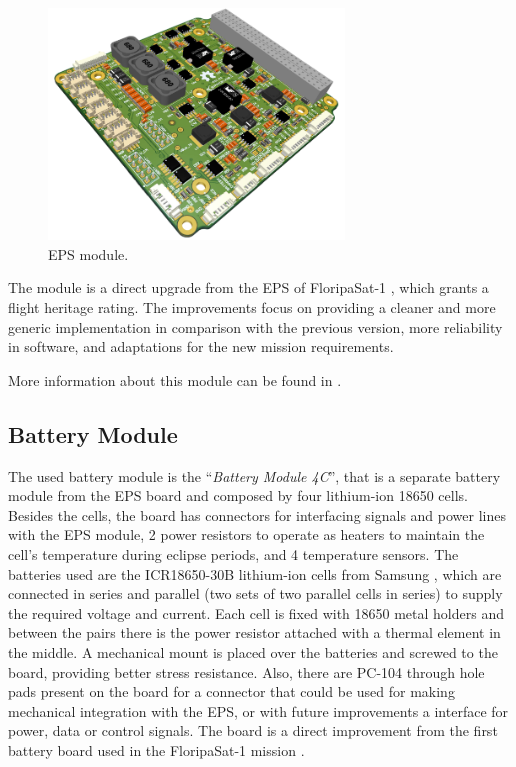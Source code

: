 \begin{figure}[!ht]
    \begin{center}
        \includegraphics[width=0.7\textwidth]{figures/eps2-pcb-3d}
        \caption{EPS module.}
        \label{fig:eps2}
    \end{center}
\end{figure}

The module is a direct upgrade from the EPS of FloripaSat-1 \cite{floripasat}, which grants a flight heritage rating. The improvements focus on providing a cleaner and more generic implementation in comparison with the previous version, more reliability in software, and adaptations for the new mission requirements.

More information about this module can be found in \cite{eps2}.

\subsection{Battery Module}

The used battery module is the ``\textit{Battery Module 4C}'', that is a separate battery module from the EPS board and composed by four lithium-ion 18650 cells. Besides the cells, the board has connectors for interfacing signals and power lines with the EPS module, 2 power resistors to operate as heaters to maintain the cell's temperature during eclipse periods, and 4 temperature sensors. The batteries used are the ICR18650-30B lithium-ion cells from Samsung \cite{icr18650-30b}, which are connected in series and parallel (two sets of two parallel cells in series) to supply the required voltage and current. Each cell is fixed with 18650 metal holders and between the pairs there is the power resistor attached with a thermal element in the middle. A mechanical mount is placed over the batteries and screwed to the board, providing better stress resistance. Also, there are PC-104 through hole pads present on the board for a connector that could be used for making mechanical integration with the EPS, or with future improvements a interface for power, data or control signals. The board is a direct improvement from the first battery board used in the FloripaSat-1 mission \cite{floripasat}.

